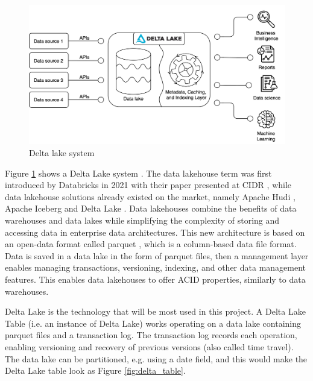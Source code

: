 \begin{figure}[!ht]
    \begin{center}
      \includegraphics[width=\textwidth]{figures/2-background/DeltaLake_evolution-DeltaLake.png}
    \end{center}
    \caption{Delta lake system}
    \label{fig:DeltaLake}
\end{figure}

Figure \ref{fig:DeltaLake} shows a Delta Lake system \cite{armbrustDeltaLakeHighperformance2020}. The data lakehouse term was first introduced by Databricks in 2021 with their paper presented at \gls{CIDR} \cite{lakehouse2021}, while data lakehouse solutions already existed on the market, namely Apache Hudi \cite{rajaperumalUberEngineeringIncremental2017}, Apache Iceberg \cite{ApacheIcebergApache} and Delta Lake \cite{armbrustDeltaLakeHighperformance2020}. Data lakehouses combine the benefits of data warehouses and data lakes while simplifying the complexity of storing and accessing data in enterprise data architectures. This new architecture is based on an open-data format called parquet \cite{Parquet}, which is a column-based data file format. Data is saved in a data lake in the form of parquet files, then a management layer enables managing transactions, versioning, indexing, and other data management features. This enables data lakehouses to offer \gls{ACID} properties, similarly to data warehouses. 

Delta Lake is the technology that will be most used in this project. A Delta Lake Table (i.e. an instance of Delta Lake) works operating on a data lake containing parquet files and a transaction log. The transaction log records each operation, enabling versioning and recovery of previous versions (also called time travel). The data lake can be partitioned, e.g. using a date field, and this would make the Delta Lake table look as Figure \ref{fig:delta_table}. 

